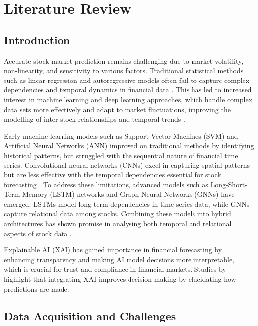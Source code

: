 \section{Literature Review}
\subsection{Introduction}

Accurate stock market prediction remains challenging due to market volatility, non-linearity, and sensitivity to various factors. Traditional statistical methods such as linear regression and autoregressive models often fail to capture complex dependencies and temporal dynamics in financial data \citep{gandhmal2019}. This has led to increased interest in machine learning and deep learning approaches, which handle complex data sets more effectively and adapt to market fluctuations, improving the modelling of inter-stock relationships and temporal trends \citep{senapati2018}.

Early machine learning models such as Support Vector Machines (SVM) and Artificial Neural Networks (ANN) improved on traditional methods by identifying historical patterns, but struggled with the sequential nature of financial time series. Convolutional neural networks (CNNs) excel in capturing spatial patterns but are less effective with the temporal dependencies essential for stock forecasting \citep{senapati2018}. To address these limitations, advanced models such as Long-Short-Term Memory (LSTM) networks and Graph Neural Networks (GNNs) have emerged. LSTMs model long-term dependencies in time-series data, while GNNs capture relational data among stocks. Combining these models into hybrid architectures has shown promise in analysing both temporal and relational aspects of stock data \citep{thakkar2021, ran2024}.

Explainable AI (XAI) has gained importance in financial forecasting by enhancing transparency and making AI model decisions more interpretable, which is crucial for trust and compliance in financial markets. Studies by \citet{kuiper2022} highlight that integrating XAI improves decision-making by elucidating how predictions are made.

\subsection{Data Acquisition and Challenges}

